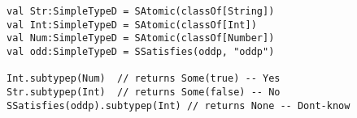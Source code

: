 \begin{lstlisting}[style=reclojureScala]
val Str:SimpleTypeD = SAtomic(classOf[String])
val Int:SimpleTypeD = SAtomic(classOf[Int])
val Num:SimpleTypeD = SAtomic(classOf[Number])
val odd:SimpleTypeD = SSatisfies(oddp, "oddp")

Int.subtypep(Num)  // returns Some(true) -- Yes
Str.subtypep(Int)  // returns Some(false) -- No
SSatisfies(oddp).subtypep(Int) // returns None -- Dont-know
\end{lstlisting}
